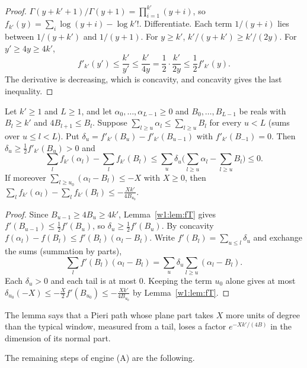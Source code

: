 \begin{proof}
$\Gamma(y+k'+1)/\Gamma(y+1)=\prod_{i=1}^{k'}(y+i)$, so $f_{k'}(y)=\sum_i\log(y+i)-\log k'!$. Differentiate. Each term $1/(y+i)$ lies between $1/(y+k')$ and $1/(y+1)$. For $y\ge k'$, $k'/(y+k')\ge k'/(2y)$. For $y'\ge4y\ge4k'$,
\[
f'_{k'}(y')\le\frac{k'}{y'}\le\frac{k'}{4y}=\frac12\cdot\frac{k'}{2y}\le\frac12f'_{k'}(y).
\]
The derivative is decreasing, which is concavity, and concavity gives the last inequality.
\end{proof}

\begin{lemma}\label{w1:lem:deficit}
Let $k'\ge1$ and $L\ge1$, and let $\alpha_0,\dots,\alpha_{L-1}\ge0$ and $B_0,\dots,B_{L-1}$ be reals with $B_l\ge k'$ and $4B_{l+1}\le B_l$. Suppose $\sum_{l\ge u}\alpha_l\le\sum_{l\ge u}B_l$ for every $u<L$ (sums over $u\le l<L$). Put $\delta_u=f'_{k'}(B_u)-f'_{k'}(B_{u-1})$ with $f'_{k'}(B_{-1})=0$. Then $\delta_u\ge\frac12f'_{k'}(B_u)>0$ and
\[
\sum_lf_{k'}(\alpha_l)-\sum_lf_{k'}(B_l)\le\sum_u\delta_u\Big(\sum_{l\ge u}\alpha_l-\sum_{l\ge u}B_l\Big)\le0 .
\]
If moreover $\sum_{l\ge u_0}(\alpha_l-B_l)\le-X$ with $X\ge0$, then $\sum_lf_{k'}(\alpha_l)-\sum_lf_{k'}(B_l)\le-\frac{Xk'}{4B_{u_0}}$.
\end{lemma}

\begin{proof}
Since $B_{u-1}\ge4B_u\ge4k'$, Lemma~\ref{w1:lem:fT} gives $f'(B_{u-1})\le\frac12f'(B_u)$, so $\delta_u\ge\frac12f'(B_u)$. By concavity $f(\alpha_l)-f(B_l)\le f'(B_l)(\alpha_l-B_l)$. Write $f'(B_l)=\sum_{u\le l}\delta_u$ and exchange the sums (summation by parts),
\[
\sum_lf'(B_l)(\alpha_l-B_l)=\sum_u\delta_u\sum_{l\ge u}(\alpha_l-B_l).
\]
Each $\delta_u>0$ and each tail is at most $0$. Keeping the term $u_0$ alone gives at most $\delta_{u_0}(-X)\le-\frac X2f'(B_{u_0})\le-\frac{Xk'}{4B_{u_0}}$ by Lemma~\ref{w1:lem:fT}.
\end{proof}

The lemma says that a Pieri path whose plane part takes $X$ more units of degree than the typical window, measured from a tail, loses a factor $e^{-Xk'/(4B)}$ in the dimension of its normal part.

The remaining steps of engine (A) are the following.

